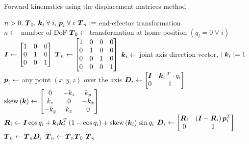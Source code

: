 \begin{algorithm}[htbp]
\caption{Forward kinematics using the displacement matrices method}
\label{alg:fk}
\begin{algorithmic}[1]
  \REQUIRE $n > 0,\, \boldsymbol{T}_0,\, \boldsymbol{k}_i\;\forall{}\;i ,\, \boldsymbol{p}_i\;\forall{}\;i $
  \ENSURE $\boldsymbol{T}_n :=$ end-effector transformation \\
  \STATE $n \leftarrow$ number of DoF
  \STATE $\boldsymbol{T}_0 \leftarrow$ transformation at home position $\left(q_i=0\;\forall{}\;i\right)$
  \matrixspace
  \STATE $\boldsymbol{I} \leftarrow \begin{bmatrix}
    1   & 0   & 0  \\
    0   & 1   & 0  \\
    0   & 0   & 1
    \end{bmatrix}$ 
  \matrixspace
  \STATE $\boldsymbol{T}_n \leftarrow \begin{bmatrix}
    1   & 0   & 0  & 0  \\
    0   & 1   & 0  & 0  \\
    0   & 0   & 1  & 0  \\
    0   & 0   & 0  & 1
    \end{bmatrix}$
  \matrixspace
  \STATE $\boldsymbol{k}_i \leftarrow$ joint axis direction vector, $\mid\boldsymbol{k}_i\mid = 1$
  \STATE $\boldsymbol{p}_i \leftarrow$ any point $\left(x,y,z\right)$ over the axis
   \label{line:fk_if_type}
  \matrixspace
  \STATE $\boldsymbol{D}_i \leftarrow \begin{bmatrix}
    \boldsymbol{I} & \boldsymbol{k}_i\,^T\cdot q_i\\
    0       & 1
    \end{bmatrix}$
  \matrixspace
  \matrixspace
  \STATE $\mbox{skew}\left(\boldsymbol{k}\right) \leftarrow \begin{bmatrix}
    0     & -k_z  & k_y  \\
    k_z   & 0     & -k_x  \\
    -k_y  & k_x   & 0
    \end{bmatrix}$
  \matrixspace
  \STATE $\boldsymbol{R}_i \leftarrow \boldsymbol{I}\cos{q_i}+\boldsymbol{k}_i\boldsymbol{k}_i^T\left(1-\cos{q_i}\right) + \mbox{skew}\left(\boldsymbol{k}_i\right)\,\sin{q_i}$
  \matrixspace
  \STATE $\boldsymbol{D}_i \leftarrow \begin{bmatrix}
    \boldsymbol{R}_i   & \left(\boldsymbol{I} - \boldsymbol{R}_i\right)\boldsymbol{p}_i^T\\
    0   & 1
    \end{bmatrix}$
  \matrixspace
  \ENDIF \label{line:fk_endif_type}
  \STATE $\boldsymbol{T}_n \leftarrow \boldsymbol{T}_n\boldsymbol{D}_i$
  \ENDFOR
  \STATE $\boldsymbol{T}_n \leftarrow \boldsymbol{T}_n\boldsymbol{T}_0$
  \RETURN $\boldsymbol{T}_n$
\end{algorithmic}
\end{algorithm}

